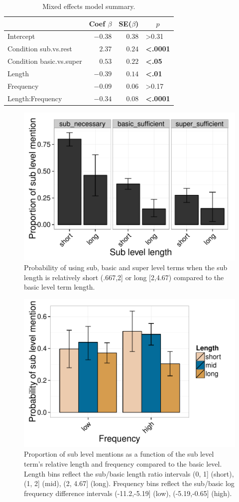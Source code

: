 \documentclass[10pt,letterpaper]{article}
\begin{document}
\begin{table}[!tbp]
\caption{Mixed effects model summary.}
\begin{center}
\begin{tabular}{lrrl}
\toprule
\multicolumn{1}{l}{}&\multicolumn{1}{c}{Coef $\beta$}&\multicolumn{1}{c}{SE($\beta$)}&\multicolumn{1}{c}{$p$}\tabularnewline
\midrule
Intercept&$-0.38$&$0.38$&\textgreater0.31\tabularnewline
Condition sub.vs.rest&$ 2.37$&$0.24$&\textbf{\textless.0001}\tabularnewline
Condition basic.vs.super&$ 0.53$&$0.22$&\textbf{\textless.05}\tabularnewline
Length&$-0.39$&$0.14$&\textbf{\textless.01}\tabularnewline
Frequency&$-0.09$&$0.06$&\textgreater0.17\tabularnewline
Length:Frequency&$-0.34$&$0.08$&\textbf{\textless.0001}\tabularnewline
\bottomrule
\end{tabular}\end{center}
\label{tab:modelresults}
\end{table}


\begin{figure}[ht!]
\centering
\includegraphics[width=.5\textwidth]{graphs/length-effect}
\caption{Probability of using sub, basic and super level terms when the sub  length is relatively short (.667,2] or long [2,4.67) compared to the basic level term length.}
 \label{fig:lengtheffect}
\end{figure}



\begin{figure}[ht!]
\centering
\includegraphics[width=.5\textwidth]{graphs/freq-length-interaction}
\caption{Proportion of sub level mentions  as a function of the sub level term's relative length and frequency compared to the basic level. Length bins reflect the sub/basic length ratio intervals (0, 1] (short), (1, 2] (mid), (2, 4.67] (long). Frequency bins reflect the sub/basic log frequency difference intervals (-11.2,-5.19] (low), (-5.19,-0.65] (high).}
\label{fig:lengthfreqinteraction}
\end{figure}
\end{document}
